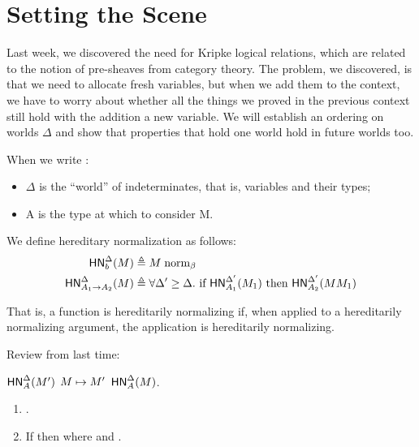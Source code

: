 \documentclass{article}
\begin{document}
\maketitle

\section{Setting the Scene}
Last week, we discovered the need for Kripke logical relations, which are related to the notion of pre-sheaves from category theory. The problem, we discovered, is that we need to allocate fresh variables, but when we add them to the context, we have to worry about whether all the things we proved in the previous context still hold with the addition a new variable. We will establish an ordering on worlds $\Delta$ and show that properties that hold one world hold in future worlds too.

When we write :
\begin{itemize}
\item $\Delta$ is the ``world'' of indeterminates, that is, variables and their types;
\item A is the type at which to consider M.
\end{itemize}


We define hereditary normalization as follows:
\begin{align*}
\hnorm{\Delta}{b}{M} &\triangleq \bnorm{M} \\
\hnorm{\Delta}{\fn{A_1}{A_2}}{M} &\triangleq  \forall \Delta' \geq \Delta. \  \text{if} \ \hnorm{\Delta'}{A_1}{M_1}\  \text{then} \ \hnorm{\Delta'}{A_2}{M M_1}
\end{align*}


That is, a function is hereditarily normalizing if, when applied to a hereditarily normalizing argument, the application is hereditarily normalizing.

Review from last time:
\begin{lemma}\label{lem:hexp}
   $\mathsf{HN}^{\Delta}_{A}(M')$  $M \mapsto M'$  $\mathsf{HN}^{\Delta}_{A}(M)$.
\end{lemma}

\begin{lemma}[Workhorse]\label{lem:workhorse}
\leavevmode %
\begin{enumerate}
\item {}   .
\item If \bnorm{\E} then  where  and .
\end{enumerate}
\end{lemma}
\end{document}
